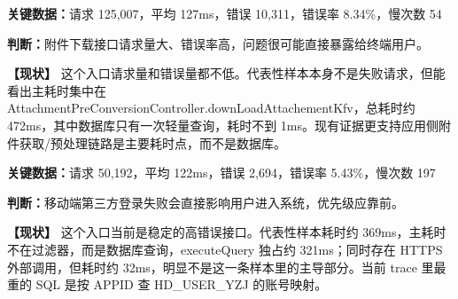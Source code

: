 \vspace{0.35em}\par

\noindent\textbf{关键数据：}请求 125,007，平均 127ms，错误 10,311，错误率 8.34\%，慢次数 54\par

\noindent\textbf{判断：}附件下载接口请求量大、错误率高，问题很可能直接暴露给终端用户。\par

\vspace{0.25em}

\noindent\textbf{【现状】} 这个入口请求量和错误量都不低。代表性样本本身不是失败请求，但能看出主耗时集中在 AttachmentPreConversionController.downLoadAttachementKfv，总耗时约 472ms，其中数据库只有一次轻量查询，耗时不到 1ms。现有证据更支持应用侧附件获取/预处理链路是主要耗时点，而不是数据库。\par

\vspace{0.35em}\par

\noindent\textbf{关键数据：}请求 50,192，平均 122ms，错误 2,694，错误率 5.43\%，慢次数 197\par

\noindent\textbf{判断：}移动端第三方登录失败会直接影响用户进入系统，优先级应靠前。\par

\vspace{0.25em}

\noindent\textbf{【现状】} 这个入口当前是稳定的高错误接口。代表性样本耗时约 369ms，主耗时不在过滤器，而是数据库查询，executeQuery 独占约 321ms；同时存在 HTTPS 外部调用，但耗时约 32ms，明显不是这一条样本里的主导部分。当前 trace 里最重的 SQL 是按 APPID 查 HD\_USER\_YZJ 的账号映射。\par

\vspace{0.25em}
